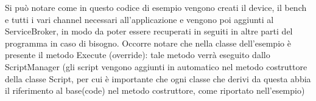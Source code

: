 \documentclass{article}
\begin{document}
		Si può notare come in questo codice di esempio vengono creati il device, il bench e tutti i vari channel necessari all'applicazione e vengono poi aggiunti al ServiceBroker, in modo da poter essere recuperati in seguiti in altre parti del programma in caso di bisogno. Occorre notare che nella classe dell'esempio è presente il metodo Execute (override): tale metodo verrà eseguito dallo ScriptManager (gli script vengono aggiunti in automatico nel metodo costruttore della classe Script, per cui è importante che ogni classe che derivi da questa abbia il riferimento al base(code) nel metodo costruttore, come riportato nell'esempio)
	\newpage
\end{document}
